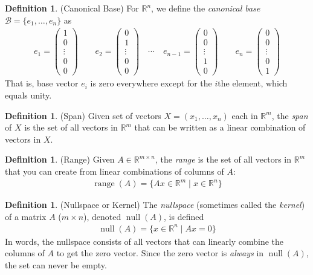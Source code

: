 \documentclass[12pt]{article}
\numberwithin{equation}{section} %
\theoremstyle{plain}
\theoremstyle{definition}
\newtheorem{defn}[thm]{Definition}
\theoremstyle{remark}
\newcommand{\Rn}{\mathbb{R}^n}
\newcommand{\Rm}{\mathbb{R}^m}
\newcommand{\Rmn}{\mathbb{R}^{m\times n}}
\newcommand{\nul}{\operatorname{null}}
\newcommand{\range}{\operatorname{range}}
\begin{document}
\begin{defn}{(Canonical Base)}
For $\Rn$, we define the \emph{canonical base}
$\mathcal{B}=\{e_1,\ldots,e_n\}$ as
\begin{align*}
  e_1 =
  \begin{pmatrix}
  1 \\ 0 \\ \vdots \\ 0 \\ 0
  \end{pmatrix}
  \qquad
  e_2 =
  \begin{pmatrix}
  0 \\ 1 \\ \vdots \\ 0 \\ 0
  \end{pmatrix}
  \quad \cdots \quad
  e_{n-1} =
  \begin{pmatrix}
  0 \\ 0 \\ \vdots \\ 1 \\ 0
  \end{pmatrix}
  \qquad
  e_n =
  \begin{pmatrix}
  0 \\ 0 \\ \vdots \\ 0 \\ 1
  \end{pmatrix}
\end{align*}
That is, base vector $e_i$ is zero everywhere except for the $i$the
element, which equals unity.
\end{defn}

\begin{defn}(Span)
Given set of vectors $X=(x_1,\ldots,x_n)$ each in $\Rm$, the
\emph{span} of $X$ is the set of all vectors in $\Rm$ that can be
written as a linear combination of vectors in $X$.
\end{defn}

\begin{defn}(Range)
Given $A\in\Rmn$, the \emph{range} is the set of all vectors in $\Rm$
that you can create from linear combinations of columns of $A$:
\begin{align*}
  \range(A)
  =\{Ax\in\Rm\;|\; x\in\Rn\}
\end{align*}
\end{defn}

\begin{defn}(Nullspace or Kernel)
The \emph{nullspace} (sometimes called the \emph{kernel}) of a matrix
$A$ ($m\times n$), denoted $\nul(A)$, is defined
\begin{align*}
  \nul(A)
  = \{x\in\Rn\;|\; Ax = 0\}
\end{align*}
In words, the nullspace consists of all vectors that can linearly
combine the columns of $A$ to get the zero vector.
Since the zero vector is \emph{always} in $\nul(A)$, the set can never
be empty.
\end{defn}
\end{document}
